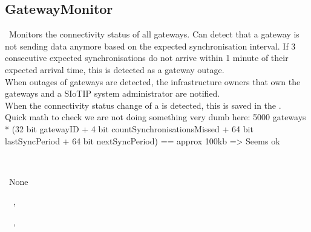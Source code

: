 \subsection{GatewayMonitor}\label{comp:OnlineServiceOnlineServiceGatewayCommunicationHandlerGatewayMonitor}
	\begin{description}
		\item[Responsibility:]~Monitors the connectivity status of all gateways. Can detect that a gateway is not sending data anymore based on the expected synchronisation interval. If 3 consecutive expected synchronisations do not arrive within 1 minute of their expected arrival time, this is detected as a gateway outage. \\
When outages of gateways are detected, the infrastructure owners that own the gateways and a SIoTIP system administrator are notified. \\
When the connectivity status change of a  is detected, this is saved in the . \\
Quick math to check we are not doing something very dumb here:
5000 gateways * (32 bit gatewayID + 4 bit countSynchronisationsMissed + 64 bit lastSyncPeriod + 64 bit nextSyncPeriod) == approx 100kb => Seems ok
		\item[Super-components:]~\iconcomponent{}~
		\item[Sub-components:]~None
		\item[Provided interfaces:]~\iconprovided{}~, \iconprovided{}~
		\item[Required interfaces:]~\iconrequired{}~, \iconrequired{}~		
	\end{description}
